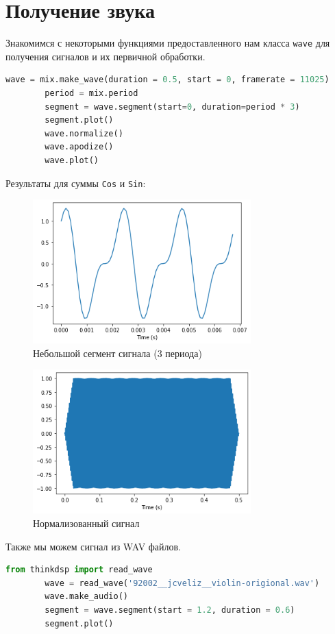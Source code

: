 \documentclass[a4paper, 12pt]{report}
\begin{document}
	\chapter{Получение звука}
	Знакомимся с некоторыми функциями предоставленного нам класса  \texttt{wave} для получения сигналов и их первичной обработки.
	\begin{lstlisting}[language=Python,caption=Получение сигнала]
		wave = mix.make_wave(duration = 0.5, start = 0, framerate = 11025)
		period = mix.period
		segment = wave.segment(start=0, duration=period * 3)
		segment.plot()
		wave.normalize()
		wave.apodize()
		wave.plot()
	\end{lstlisting}
	Результаты для суммы \texttt{Cos} и  \texttt{Sin}:
	\begin{figure}[H]
		\centering
		\includegraphics[width=0.75\textwidth]{segment_mix.png}
		\caption{Небольшой сегмент сигнала (3 периода)}
		\label{fig:segment_mix}
	\end{figure}
	\begin{figure}[H]
		\centering
		\includegraphics[width=0.75\textwidth]{wave_mix.png}
		\caption{Нормализованный сигнал}
		\label{fig:wave_mix}
	\end{figure}
	Также мы можем сигнал из WAV файлов.
	\begin{lstlisting}[language=Python,caption=Получение сигнала]
		from thinkdsp import read_wave
		wave = read_wave('92002__jcveliz__violin-origional.wav')	
		wave.make_audio()
		segment = wave.segment(start = 1.2, duration = 0.6)
		segment.plot()
	\end{lstlisting}
\end{document}
